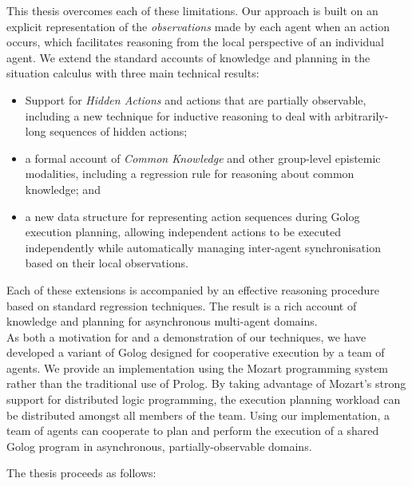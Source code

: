 This thesis overcomes each of these limitations. Our approach is built
on an explicit representation of the \emph{observations} made by each
agent when an action occurs, which facilitates reasoning from the
local perspective of an individual agent. We extend the standard accounts
of knowledge and planning in the situation calculus with three main
technical results:

\begin{itemize}
\item Support for \emph{Hidden Actions} and actions that are partially observable,
including a new technique for inductive reasoning to deal with arbitrarily-long
sequences of hidden actions; 
\item a formal account of \emph{Common Knowledge} and other group-level
epistemic modalities, including a regression rule for reasoning about
common knowledge; and 
\item a new data structure for representing action sequences during Golog
execution planning, allowing independent actions to be executed independently
while automatically managing inter-agent synchronisation based on
their local observations. 
\end{itemize}
Each of these extensions is accompanied by an effective reasoning
procedure based on standard regression techniques. The result is a
rich account of knowledge and planning for asynchronous multi-agent
domains.\\


As both a motivation for and a demonstration of our techniques, we
have developed a variant of Golog designed for cooperative execution
by a team of agents. We provide an implementation using the Mozart
programming system rather than the traditional use of Prolog. By taking
advantage of Mozart's strong support for distributed logic programming,
the execution planning workload can be distributed amongst all members
of the team\emph{.} Using our implementation, a team of agents can
cooperate to plan and perform the execution of a shared Golog program
in asynchronous, partially-observable domains.

\newpage{}

The thesis proceeds as follows:

